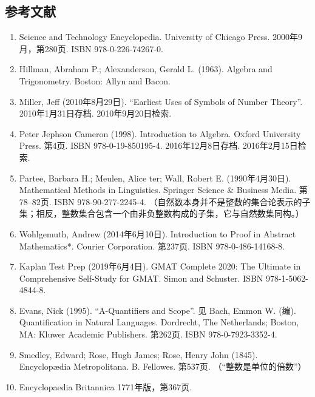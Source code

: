 \subsection{参考文献}
\begin{enumerate}
\item Science and Technology Encyclopedia. University of Chicago Press. 2000年9月，第280页. ISBN 978-0-226-74267-0.
\item Hillman, Abraham P.; Alexanderson, Gerald L. (1963). Algebra and Trigonometry. Boston: Allyn and Bacon.
\item Miller, Jeff (2010年8月29日). “Earliest Uses of Symbols of Number Theory”. 2010年1月31日存档. 2010年9月20日检索.
\item Peter Jephson Cameron (1998). Introduction to Algebra. Oxford University Press. 第4页. ISBN 978-0-19-850195-4. 2016年12月8日存档. 2016年2月15日检索.
\item Partee, Barbara H.; Meulen, Alice ter; Wall, Robert E. (1990年4月30日). Mathematical Methods in Linguistics. Springer Science & Business Media. 第78–82页. ISBN 978-90-277-2245-4. （自然数本身并不是整数的集合论表示的子集；相反，整数集合包含一个由非负整数构成的子集，它与自然数集同构。）
\item Wohlgemuth, Andrew (2014年6月10日). Introduction to Proof in Abstract Mathematics*. Courier Corporation. 第237页. ISBN 978-0-486-14168-8.
\item Kaplan Test Prep (2019年6月4日). GMAT Complete 2020: The Ultimate in Comprehensive Self-Study for GMAT. Simon and Schuster. ISBN 978-1-5062-4844-8.
\item Evans, Nick (1995). “A-Quantifiers and Scope”. 见 Bach, Emmon W. (编). Quantification in Natural Languages. Dordrecht, The Netherlands; Boston, MA: Kluwer Academic Publishers. 第262页. ISBN 978-0-7923-3352-4.
\item Smedley, Edward; Rose, Hugh James; Rose, Henry John (1845). Encyclopædia Metropolitana. B. Fellowes. 第537页. （“整数是单位的倍数”）
\item Encyclopaedia Britannica 1771年版，第367页.

\end{enumerate}
